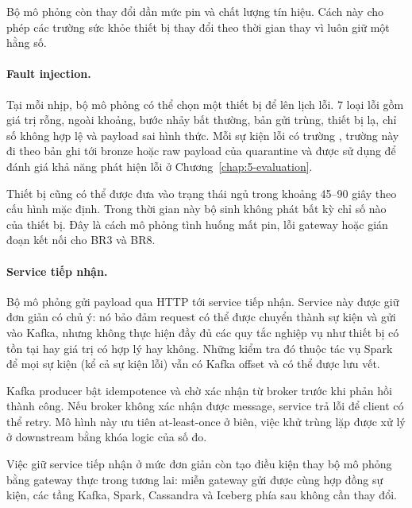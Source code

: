 Bộ mô phỏng còn thay đổi dần mức pin và chất lượng tín hiệu. Cách này cho phép các trường sức khỏe thiết bị thay đổi theo thời gian thay vì luôn giữ một hằng số.

\paragraph{Fault injection.}
Tại mỗi nhịp, bộ mô phỏng có thể chọn một thiết bị để lên lịch lỗi. 7 loại lỗi gồm giá trị rỗng, ngoài khoảng, bước nhảy bất thường, bản gửi trùng, thiết bị lạ, chỉ số không hợp lệ và payload sai hình thức. Mỗi sự kiện lỗi có trường , trường này đi theo bản ghi tới bronze hoặc raw payload của quarantine và được sử dụng để đánh giá khả năng phát hiện lỗi ở Chương~\ref{chap:5-evaluation}.

Thiết bị cũng có thể được đưa vào trạng thái ngủ trong khoảng 45--90 giây theo cấu hình mặc định. Trong thời gian này bộ sinh không phát bất kỳ chỉ số nào của thiết bị. Đây là cách mô phỏng tình huống mất pin, lỗi gateway hoặc gián đoạn kết nối cho BR3 và BR8.

\paragraph{Service tiếp nhận.}
Bộ mô phỏng gửi payload qua HTTP tới service tiếp nhận. Service này được giữ đơn giản có chủ ý: nó bảo đảm request có thể được chuyển thành sự kiện và gửi vào Kafka, nhưng không thực hiện đầy đủ các quy tắc nghiệp vụ như thiết bị có tồn tại hay giá trị có hợp lý hay không. Những kiểm tra đó thuộc tác vụ Spark để mọi sự kiện (kể cả sự kiện lỗi) vẫn có Kafka offset và có thể được lưu vết.

Kafka producer bật idempotence và chờ xác nhận từ broker trước khi phản hồi thành công. Nếu broker không xác nhận được message, service trả lỗi để client có thể retry. Mô hình này ưu tiên at-least-once ở biên, việc khử trùng lặp được xử lý ở downstream bằng khóa logic của số đo.

Việc giữ service tiếp nhận ở mức đơn giản còn tạo điều kiện thay bộ mô phỏng bằng gateway thực trong tương lai: miễn gateway gửi được cùng hợp đồng sự kiện, các tầng Kafka, Spark, Cassandra và Iceberg phía sau không cần thay đổi.



